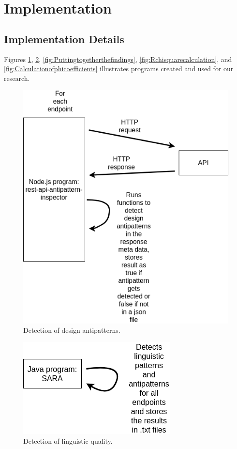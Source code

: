 \section{Implementation}

\subsection{Implementation Details}

Figures \ref{fig:Detectionofdesignantipatterns}, \ref{fig:Detectionoflinguisticquality}, \ref{fig:Puttingtogetherthefindings}, \ref{fig:Rchisquarecalculation}, and \ref{fig:Calculationofphicoefficients} illustrates programs created and used for our research.

\begin{figure}[h!]
 \centering
 \includegraphics[scale=0.5]{img/method_figures/rest-api-antipattern-inspector.png}
 \caption{Detection of design antipatterns.}
 \label{fig:Detectionofdesignantipatterns}
\end{figure}

\begin{figure}[h!]
 \centering
 \includegraphics[scale=0.55]{img/method_figures/JAVA_SARA.png}
 \caption{Detection of linguistic quality.}
 \label{fig:Detectionoflinguisticquality}
\end{figure}

